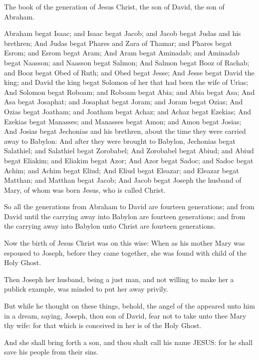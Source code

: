 \Chapter
\Verse The book of the generation of Jesus Christ, the son of David, the son of Abraham.

\Verse Abraham begat Isaac; and Isaac begat Jacob; and Jacob begat Judas and his brethren; \Verse And Judas begat Phares and Zara of Thamar; and Phares begat Esrom; and Esrom begat Aram; \Verse And Aram begat Aminadab; and Aminadab begat Naasson; and Naasson begat Salmon; \Verse And Salmon begat Booz of Rachab; and Booz begat Obed of Ruth; and Obed begat Jesse; \Verse And Jesse begat David the king; and David the king begat Solomon of her that had been the wife of Urias; \Verse And Solomon begat Roboam; and Roboam begat Abia; and Abia begat Asa; \Verse And Asa begat Josaphat; and Josaphat begat Joram; and Joram begat Ozias; \Verse And Ozias begat Joatham; and Joatham begat Achaz; and Achaz begat Ezekias; \Verse And Ezekias begat Manasses; and Manasses begat Amon; and Amon begat Josias; \Verse And Josias begat Jechonias and his brethren, about the time they were carried away to Babylon: \Verse And after they were brought to Babylon, Jechonias begat Salathiel; and Salathiel begat Zorobabel; \Verse And Zorobabel begat Abiud; and Abiud begat Eliakim; and Eliakim begat Azor; \Verse And Azor begat Sadoc; and Sadoc begat Achim; and Achim begat Eliud; \Verse And Eliud begat Eleazar; and Eleazar begat Matthan; and Matthan begat Jacob; \Verse And Jacob begat Joseph the husband of Mary, of whom was born Jesus, who is called Christ.

\Verse So all the generations from Abraham to David are fourteen generations; and from David until the carrying away into Babylon are fourteen generations; and from the carrying away into Babylon unto Christ are fourteen generations.

\Verse Now the birth of Jesus Christ was on this wise: When as his mother Mary was espoused to Joseph, before they came together, she was found with child of the Holy Ghost.

\Verse Then Joseph her husband, being a just man, and not willing to make her a publick example, was minded to put her away privily.

\Verse But while he thought on these things, behold, the angel of the \LORD appeared unto him in a dream, saying, Joseph, thou son of David, fear not to take unto thee Mary thy wife: for that which is conceived in her is of the Holy Ghost.

\Verse And she shall bring forth a son, and thou shalt call his name JESUS: for he shall save his people from their sins.

